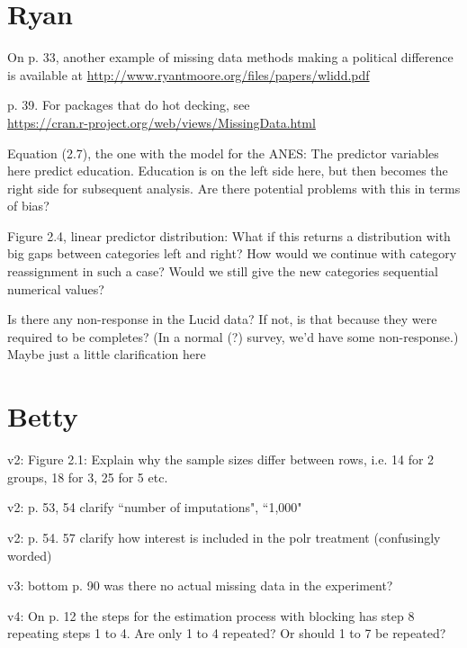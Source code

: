 \documentclass[12pt]{article}
\begin{document}
\section*{Ryan}
	\begin{coi}
		\item On p. 33, another example of missing data methods making a political difference is available at \href{http://www.ryantmoore.org/files/papers/wlidd.pdf}{http://www.ryantmoore.org/files/papers/wlidd.pdf}
		\item p. 39. For packages that do hot decking, see \\\href{https://cran.r-project.org/web/views/MissingData.html}{https://cran.r-project.org/web/views/MissingData.html}
		\item Equation (2.7), the one with the model for the ANES: The predictor variables here predict education. Education is on the left side here, but then becomes the right side for subsequent analysis. Are there potential problems with this in terms of bias?
		\item Figure 2.4, linear predictor distribution: What if this returns a distribution with big gaps between categories left and right? How would we continue with category reassignment in such a case? Would we still give the new categories sequential numerical values?
		\item Is there any non-response in the Lucid data? If not, is that because they were required to be completes? (In a normal (?) survey, we'd have some non-response.) Maybe just a little clarification here
	\end{coi}

\section*{Betty}
	\begin{coi}
		\item v2: Figure 2.1: Explain why the sample sizes differ between rows, i.e. 14 for 2 groups, 18 for 3, 25 for 5 etc.
		\item v2: p. 53, 54 clarify ``number of imputations", ``1,000"
		\item v2: p. 54. 57 clarify how interest is included in the polr treatment (confusingly worded)
		\item v3: bottom p. 90 was there no actual missing data in the experiment?
		\item v4: On p. 12 the steps for the estimation process with blocking has step 8 repeating steps 1 to 4. Are only 1 to 4 repeated? Or should 1 to 7 be repeated?
	\end{coi}
\end{document}
